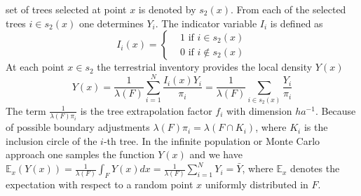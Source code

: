 \documentclass[a4paper,12pt,leqno, titlepage]{article}
\newcommand{\EX}{\mathbb{E}}
\begin{document}
set of trees selected at point $x$ is denoted by $s_{2}(x)$. From each of the
selected trees $i\in{s_{2}(x)}$ one determines $Y_i$. The indicator variable $I_i$ is defined as
\begin{equation}\label{1stage}
 I_i(x)=\begin{cases}&1 \text{ if $i\in s_{2}(x)$}\\
                      &0 \text{ if $i\not\in s_{2}(x)$}
         \end{cases}
\end{equation}
At each point $x\in{s_2}$ the
terrestrial inventory provides the local density $Y(x)$
\begin{equation}\label{truelocaldensity}
 Y(x) =\frac{1}{\lambda(F)}\sum_{i=1}^N \frac{I_i(x)Y_i}{\pi_i}=\frac{1}{\lambda(F)}\sum_{i\in{s}_2(x)} \frac{Y_i}{\pi_i}
 \end{equation}
 The term $\frac{1}{\lambda(F)\pi_i}$ is the tree extrapolation factor $f_i$ with dimension $ha^{-1}$. Because of possible boundary adjustments $\lambda(F)\pi_i=\lambda(F \cap K_i)$, where $K_i$ is the inclusion circle of the $i$-th tree. In the infinite population or Monte Carlo approach one samples the function $Y(x)$ and we have $\EX_{x} (Y(x))=\frac{1}{\lambda(F)}\int_{F} Y(x)dx=\frac{1}{\lambda(F)}\sum_{i=1}^NY_i=\bar{Y}$, where $\EX_x$ denotes the expectation with respect to a random point $x$ uniformly distributed in $F$.
\end{document}
